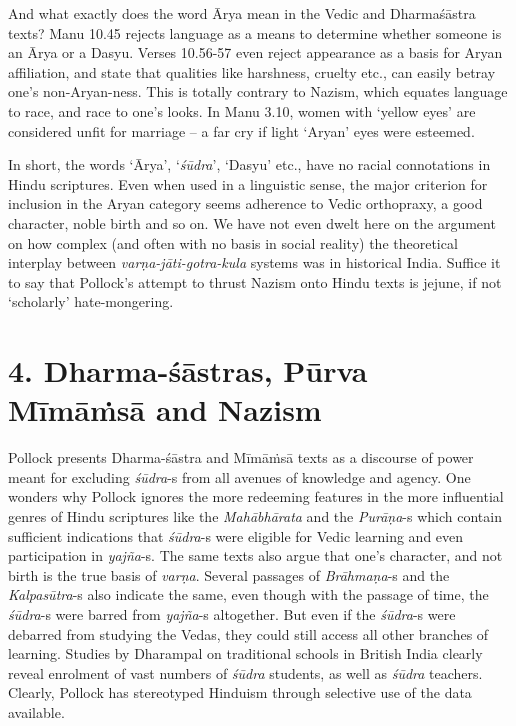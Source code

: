 And what exactly does the word Ārya mean in the Vedic and Dharmaśāstra texts? Manu 10.45 rejects language as a means to determine whether someone is an Ārya or a Dasyu. Verses 10.56-57 even reject appearance as a basis for Aryan affiliation, and state that qualities like harshness, cruelty etc., can easily betray one’s non-Aryan-ness. This is totally contrary to Nazism, which equates language to race, and race to one’s looks. In Manu 3.10, women with ‘yellow eyes’ are considered unfit for marriage – a far cry if light ‘Aryan’ eyes were esteemed.

In short, the words ‘Ārya’, ‘\textit{śūdra}’, ‘Dasyu’ etc., have no racial connotations in Hindu scriptures. Even when used in a linguistic sense, the major criterion for inclusion in the Aryan category seems adherence to Vedic orthopraxy, a good character, noble birth and so on. We have not even dwelt here on the argument on how complex (and often with no basis in social reality) the theoretical interplay between \textit{varṇa-jāti-gotra-kula} systems was in historical India. Suffice it to say that Pollock’s attempt to thrust Nazism onto Hindu texts is jejune, if not ‘scholarly’ hate-mongering.

\vspace{-.3cm}

\section*{4. Dharma-śāstras, Pūrva Mīmāṁsā and Nazism}

Pollock presents Dharma-śāstra and Mīmāṁsā texts as a discourse of power meant for excluding \textit{śūdra}-s from all avenues of knowledge and agency. One wonders why Pollock ignores the more redeeming features in the more influential genres of Hindu scriptures like the \textit{Mahābhārata} and the \textit{Purāṇa}-s which contain sufficient indications that \textit{śūdra}-s were eligible for Vedic learning and even participation in \textit{yajña}-s. The same texts also argue that one’s character, and not birth is the true basis of \textit{varṇa}. Several passages of \textit{Brāhmaṇa}-s and the \textit{Kalpasūtra}-s also indicate the same, even though with the passage of time, the \textit{śūdra}-s were barred from \textit{yajña}-s altogether. But even if the \textit{śūdra}-s were debarred from studying the Vedas, they could still access all other branches of learning. Studies by Dharampal on traditional schools in British India clearly reveal enrolment of vast numbers of \textit{śūdra} students, as well as \textit{śūdra} teachers. Clearly, Pollock has stereotyped Hinduism through selective use of the data available.

